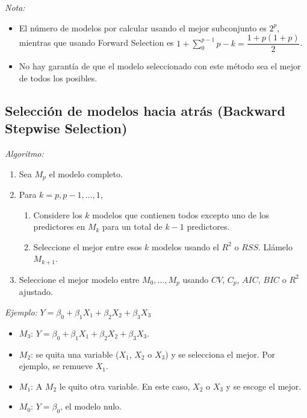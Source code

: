 \documentclass[
  12pt,
]{book}
\providecommand{\tightlist}{%
  \setlength{\itemsep}{0pt}\setlength{\parskip}{0pt}}
\begin{document}
\emph{Nota:}

\begin{itemize}
\item
  El número de modelos por calcular usando el mejor subconjunto es
  \(2^p\), mientras que usando Forward Selection es
  \(1+\displaystyle\sum_0^ {p-1} p-k = \dfrac{1+p(1+p)}2\).
\item
  No hay garantía de que el modelo seleccionado con este método sea el
  mejor de todos los posibles.
\end{itemize}

\hypertarget{selecciuxf3n-de-modelos-hacia-atruxe1s-backward-stepwise-selection}{%
\subsection{\texorpdfstring{Selección de modelos hacia atrás
(\textbf{Backward Stepwise
Selection})}{Selección de modelos hacia atrás (Backward Stepwise Selection)}}\label{selecciuxf3n-de-modelos-hacia-atruxe1s-backward-stepwise-selection}}

\emph{Algoritmo:}

\begin{enumerate}
\def\labelenumi{\arabic{enumi}.}
\tightlist
\item
  Sea \(M_p\) el modelo completo.
\item
  Para \(k=p,p-1,\dots,1\),

  \begin{enumerate}
  \def\labelenumii{\alph{enumii}.}
  \tightlist
  \item
    Considere los \(k\) modelos que contienen todos excepto uno de los
    predictores en \(M_k\) para un total de \(k-1\) predictores.
  \item
    Seleccione el mejor entre esos \(k\) modelos usando el \(R^2\) o
    \(RSS\). Llámelo \(M_{k+1}\).
  \end{enumerate}
\item
  Seleccione el mejor modelo entre \(M_0,\dots,M_p\) usando \(CV\),
  \(C_p\), \(AIC\), \(BIC\) o \(R^2\) ajustado.
\end{enumerate}

\emph{Ejemplo:} \(Y=\beta_0+\beta_1X_1+\beta_2X_2+\beta_3X_3\)

\begin{itemize}
\item
  \(M_3\): \(Y = \beta_0 +\beta_1X_1+\beta_2X_2+\beta_3X_3\).
\item
  \(M_2\): se quita una variable (\(X_1\), \(X_2\) o \(X_3\)) y se
  selecciona el mejor. Por ejemplo, se remueve \(X_1\).
\item
  \(M_1\): A \(M_{2}\) le quito otra variable. En este caso, \(X_2\) o
  \(X_3\) y se escoge el mejor.
\item
  \(M_0\): \(Y=\beta_0\), el modelo nulo.
\end{itemize}
\end{document}
